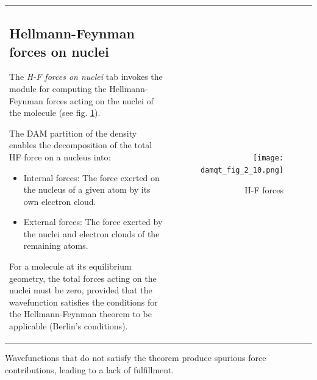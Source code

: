 \documentclass[10pt]{article}
\begin{document}
\vspace*{5mm}
\begin{tabular}{lr}
\hspace*{-3mm}
\begin{minipage}{.6\linewidth}

\subsection{Hellmann-Feynman forces on nuclei
\label{sec:2.10}\index{Hellmann-Feynman!forces}}

The {\it H-F forces on nuclei}\index{forces} tab invokes the module
for computing the Hellmann-Feynman forces acting on the nuclei of the molecule
(see fig. \ref{fig:2_10}).

The DAM\index{DAM} partition of the density enables the decomposition of
the total HF force on a nucleus into:

\begin{itemize}
\item Internal forces\index{forces!internal}: The force exerted on the nucleus of a given atom by its own electron cloud.
\item External forces\index{forces!external}: The force exerted by the nuclei and electron clouds of the remaining atoms.
\end{itemize}

For a molecule at its equilibrium geometry,
the total forces\index{forces!total} acting on the nuclei must be zero,
provided that the wavefunction satisfies the conditions
for the Hellmann-Feynman theorem\index{Hellmann-Feynman!theorem} to be applicable (Berlin's conditions\footnotemark\index{Hellmann-Feynman!theorem!fulfillment}).

\end{minipage}
&
\begin{minipage}{.4\linewidth}

\vspace*{-1.0cm}
\begin{figure}[H]
\begin{center}
\texttt{[image: damqt\_fig\_2\_10.png]}
\end{center}
\caption{H-F forces\label{fig:2_10}}
\end{figure}
\end{minipage}
\end{tabular}
\vspace*{1pt}

Wavefunctions that do not satisfy the theorem produce spurious force contributions,
leading to a lack of fulfillment.
\end{document}
